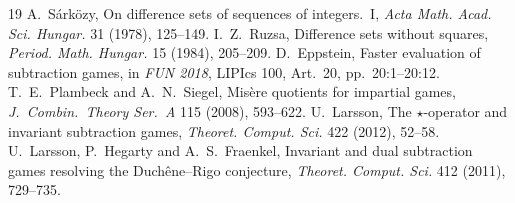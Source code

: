 \begin{thebibliography}{19}
 A.~S\'ark\"ozy, On difference sets of sequences of
  integers.~I, \emph{Acta Math. Acad. Sci. Hungar.} 31 (1978), 125--149.
 I.~Z.~Ruzsa, Difference sets without squares,
  \emph{Period. Math. Hungar.} 15 (1984), 205--209.
 D.~Eppstein, Faster evaluation of subtraction
  games, in \emph{FUN 2018}, LIPIcs 100, Art.~20, pp.~20:1--20:12.
 T.~E.~Plambeck and A.~N.~Siegel, Mis\`ere
  quotients for impartial games, \emph{J.~Combin.\ Theory Ser.~A} 115
  (2008), 593--622.
 U.~Larsson, The $\star$-operator and invariant
  subtraction games, \emph{Theoret. Comput. Sci.} 422 (2012), 52--58.
 U.~Larsson, P.~Hegarty and A.~S.~Fraenkel, Invariant and
  dual subtraction games resolving the Duch\^ene--Rigo conjecture,
  \emph{Theoret. Comput. Sci.} 412 (2011), 729--735.
\end{thebibliography}


